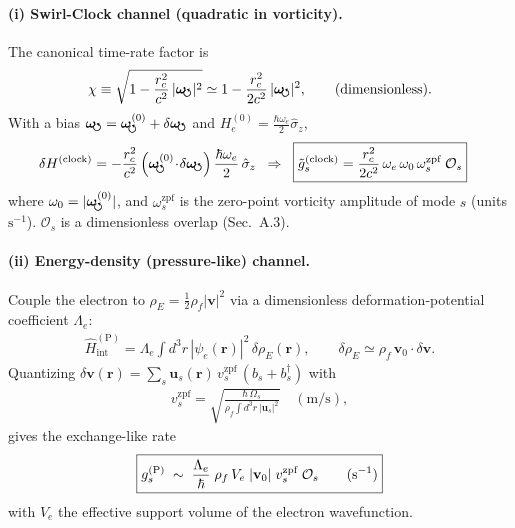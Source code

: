 \documentclass[aps,prb,preprint,amsmath,amssymb]{revtex4-2} %
\newcommand{\omegas}{\boldsymbol{\omega}_{\!\mkern-2mu\scriptstyle\boldsymbol{\circlearrowleft}}}
\newcommand{\rc}{r_c}
\newcommand{\rhoF}{\rho_{f}}
\newcommand{\rhoE}{\rho_{E}}
\begin{document}
        \paragraph*{(i) Swirl-Clock channel (quadratic in vorticity).}
            The canonical time-rate factor is
            \begin{align}
                \chi \equiv \sqrt{1-\frac{\rc^{2}}{c^2}\,|\omegas|^2}
                \simeq 1 - \frac{\rc^{2}}{2c^2}\,|\omegas|^2,
                \qquad \text{(dimensionless)} .
            \end{align}
            With a bias \(\omegas=\omegas^{(0)}+\delta\omegas\) and \(H_e^{(0)}=\tfrac{\hbar\omega_e}{2}\hat\sigma_z\),
            \begin{align}
                \delta H^{(\text{clock})} &= -\frac{\rc^2}{c^2}\,\Big(\omegas^{(0)}\!\cdot\!\delta\omegas\Big)\,\frac{\hbar\omega_e}{2}\,\hat\sigma_z
                \;\;\Rightarrow\;\;
                \boxed{%
                    \tilde g_{s}^{(\text{clock})} = \frac{\rc^2}{2c^2}\,\omega_e\,\omega_0\,\omega_{s}^\textrm{zpf}\;\mathcal O_s
                }\label{eq:gclock}
            \end{align}
            where \(\omega_0=|\omegas^{(0)}|\), and \(\omega_{s}^\textrm{zpf}\) is the zero-point vorticity amplitude of mode \(s\) (units \(\mathrm{s^{-1}}\)). \(\mathcal O_s\) is a dimensionless overlap (Sec.~A.3).

        \paragraph*{(ii) Energy-density (pressure-like) channel.}
            Couple the electron to \(\rhoE=\tfrac12\rhoF|\mathbf v|^2\) via a dimensionless deformation-potential coefficient \(\Lambda_e\):
            \begin{align}
                \hat H_\textrm{int}^{(\mathrm P)}=\Lambda_e\!\int d^3r\,|\psi_e(\mathbf r)|^2\,\delta\rhoE(\mathbf r),
                \qquad
                \delta\rhoE\simeq \rhoF\,\mathbf v_0\!\cdot\!\delta\mathbf v .
            \end{align}
            Quantizing \(\delta\mathbf v(\mathbf r)=\sum_s \mathbf u_s(\mathbf r)\,v_{s}^\textrm{zpf}\,(b_s+b_s^\dagger)\) with
            \begin{align}
                v_{s}^\textrm{zpf}
                = \sqrt{\frac{\hbar\,\Omega_s}{\rhoF\int d^3r\,|\mathbf u_s|^2}}\quad(\mathrm{m/s}),
            \end{align}
            gives the exchange-like rate
            \begin{align}
                \boxed{%
                    g_s^{(\mathrm P)} \;\sim\; \frac{\Lambda_e}{\hbar}\;\rhoF\,V_e\;|\mathbf v_0|\;v_{s}^\textrm{zpf}\;\mathcal O_s \qquad (\mathrm{s^{-1}})
                }\label{eq:gP}
            \end{align}
            with \(V_e\) the effective support volume of the electron wavefunction.
\end{document}
